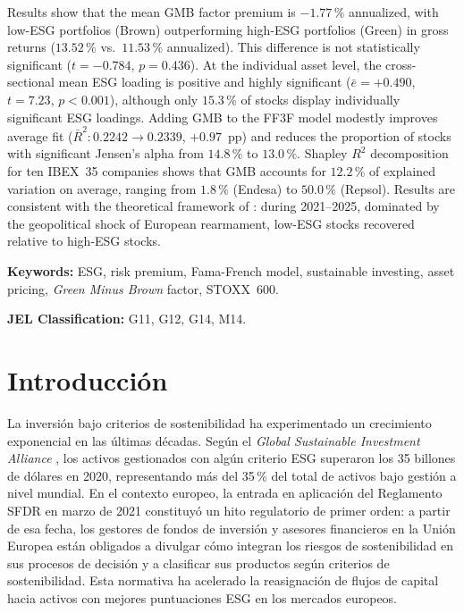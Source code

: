 \documentclass[12pt, a4paper]{article}
\begin{document}
Results show that the mean GMB factor premium is $-1.77\,\%$ annualized, with
low-ESG portfolios (Brown) outperforming high-ESG portfolios (Green) in gross
returns ($13.52\,\%$ vs.\ $11.53\,\%$ annualized). This difference is not
statistically significant ($t=-0.784$, $p=0.436$). At the individual asset level,
the cross-sectional mean ESG loading is positive and highly significant
($\bar{e}=+0.490$, $t=7.23$, $p<0.001$), although only $15.3\,\%$ of stocks display
individually significant ESG loadings. Adding GMB to the FF3F model modestly
improves average fit ($\bar{R}^2\colon 0.2242\to 0.2339$, $+0.97$~pp) and reduces
the proportion of stocks with significant Jensen's alpha from $14.8\,\%$ to $13.0\,\%$.
Shapley $R^2$ decomposition for ten IBEX~35 companies shows that GMB accounts for
$12.2\,\%$ of explained variation on average, ranging from $1.8\,\%$ (Endesa) to
$50.0\,\%$ (Repsol). Results are consistent with the theoretical framework of
\textcites{pastor2021}{pastor2022}: during 2021--2025, dominated by the geopolitical
shock of European rearmament, low-ESG stocks recovered relative to high-ESG stocks.

\vspace{1em}
\noindent\textbf{Keywords:} ESG, risk premium, Fama-French model, sustainable
investing, asset pricing, \textit{Green Minus Brown} factor, STOXX~600.

\vspace{1em}
\noindent\textbf{JEL Classification:} G11, G12, G14, M14.

\newpage
\tableofcontents
\newpage
\listoftables
\listoffigures
\newpage

\section{Introducci\'on}
\label{sec:intro}

La inversi\'on bajo criterios de sostenibilidad ha experimentado un crecimiento
exponencial en las \'ultimas d\'ecadas. Seg\'un el \textit{Global Sustainable
Investment Alliance} \parencite{gsia2022}, los activos gestionados con alg\'un
criterio ESG superaron los 35 billones de d\'olares en 2020, representando m\'as
del 35\,\% del total de activos bajo gesti\'on a nivel mundial. En el contexto
europeo, la entrada en aplicaci\'on del Reglamento SFDR \parencite{sfdr2019} en
marzo de 2021 constituy\'o un hito regulatorio de primer orden: a partir de esa
fecha, los gestores de fondos de inversi\'on y asesores financieros en la Uni\'on
Europea est\'an obligados a divulgar c\'omo integran los riesgos de sostenibilidad
en sus procesos de decisi\'on y a clasificar sus productos seg\'un criterios de
sostenibilidad. Esta normativa ha acelerado la reasignaci\'on de flujos de capital
hacia activos con mejores puntuaciones ESG en los mercados europeos.
\end{document}
